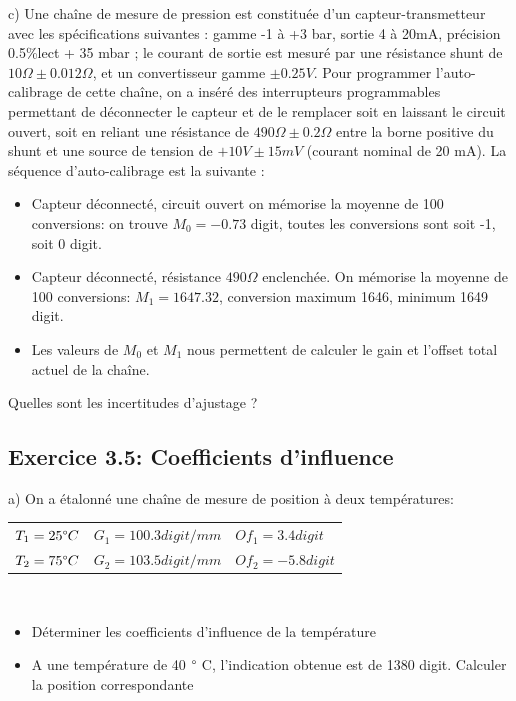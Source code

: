 \documentclass[main.tex]{subfiles}
\begin{document}
c)	Une chaîne de mesure de pression est constituée d'un capteur-transmetteur avec les spécifications suivantes : gamme -1 à +3 bar, sortie 4 à 20mA, précision 0.5\%lect + 35 mbar ; le courant de sortie est mesuré par une résistance shunt de $10 \Omega \pm 0.012 \Omega$, et un convertisseur gamme $\pm 0.25V$.
Pour programmer l'auto-calibrage de cette chaîne, on a inséré des interrupteurs programmables permettant de déconnecter le capteur et de le remplacer soit en laissant le circuit ouvert, soit en reliant une résistance de $490 \Omega \pm 0.2 \Omega$ entre la borne positive du shunt et une source de tension de $+10V \pm 15mV$ (courant nominal de 20 mA). La séquence d'auto-calibrage est la suivante :
\begin{itemize}
    \item Capteur déconnecté, circuit ouvert on mémorise la moyenne de 100 conversions: on trouve $M_0=-0.73$ digit, toutes les conversions sont soit -1, soit 0 digit.
    \item Capteur déconnecté, résistance $490 \Omega$ enclenchée. On mémorise la moyenne de 100 conversions: $M_1=1647.32$, conversion maximum 1646, minimum 1649 digit.
    \item Les valeurs de $M_0$ et $M_1$ nous permettent de calculer le gain et l'offset total actuel de la chaîne.
\end{itemize}

Quelles sont les incertitudes d'ajustage ?

\subsection*{Exercice 3.5: Coefficients d'influence}

a)	On a étalonné une chaîne de mesure de position à deux températures:


\begin {center}
\begin{tabular}{lll}
    $T_1=25 \degree C$ & $G_1= 100.3 digit/mm$  & $Of_1 = 3.4 digit$  \\
    $T_2=75 \degree C$ & $G_2 = 103.5 digit/mm$ & $Of_2 = -5.8 digit$ \\
\end{tabular}
\end{center}
~\\
\begin{itemize}
    \item Déterminer les coefficients d'influence de la température
    \item A une température de 40 $\degree$ C, l'indication obtenue est de 1380 digit. Calculer la position correspondante
\end{itemize}
~\\
\end{document}
